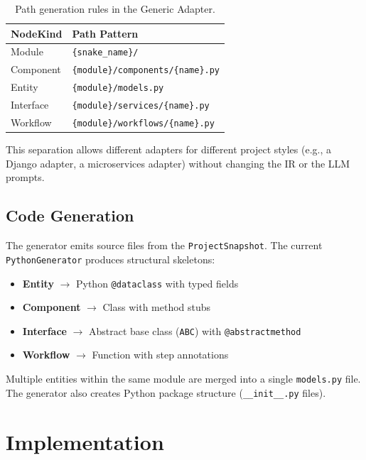 \documentclass[11pt,a4paper]{article}
\begin{document}
\begin{table}[h]
\centering
\caption{Path generation rules in the Generic Adapter.}
\label{tab:paths}
\begin{tabular}{@{}ll@{}}
\toprule
\textbf{NodeKind} & \textbf{Path Pattern} \\
\midrule
Module & \texttt{\{snake\_name\}/} \\
Component & \texttt{\{module\}/components/\{name\}.py} \\
Entity & \texttt{\{module\}/models.py} \\
Interface & \texttt{\{module\}/services/\{name\}.py} \\
Workflow & \texttt{\{module\}/workflows/\{name\}.py} \\
\bottomrule
\end{tabular}
\end{table}

This separation allows different adapters for different project styles (e.g., a Django adapter, a microservices adapter) without changing the IR or the LLM prompts.

\subsection{Code Generation}

The generator emits source files from the \texttt{ProjectSnapshot}. The current \texttt{PythonGenerator} produces structural skeletons:

\begin{itemize}
    \item \textbf{Entity} $\rightarrow$ Python \texttt{@dataclass} with typed fields
    \item \textbf{Component} $\rightarrow$ Class with method stubs
    \item \textbf{Interface} $\rightarrow$ Abstract base class (\texttt{ABC}) with \texttt{@abstractmethod}
    \item \textbf{Workflow} $\rightarrow$ Function with step annotations
\end{itemize}

Multiple entities within the same module are merged into a single \texttt{models.py} file. The generator also creates Python package structure (\texttt{\_\_init\_\_.py} files).

\section{Implementation}
\end{document}
